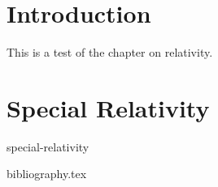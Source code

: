 \documentclass[12pt]{book}
\begin{document}
\chapter{Introduction}
This is a test of the chapter on relativity.

\chapter{Special Relativity}
{special-relativity}

{bibliography.tex}
\end{document}
